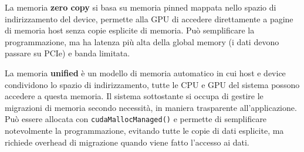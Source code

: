\begin{questions}
\begin{solution}
        La memoria \textbf{zero copy} si basa su memoria pinned mappata nello spazio di indirizzamento del device, permette alla GPU di accedere direttamente a pagine di memoria host senza copie esplicite di memoria. Può semplificare la programmazione, ma ha latenza più alta della global memory (i dati devono passare su PCIe) e banda limitata.
        
        La memoria \textbf{unified} è un modello di memoria automatico in cui host e device condividono lo spazio di indirizzamento, tutte le CPU e GPU del sistema possono accedere a questa memoria. Il sistema sottostante si occupa di gestire le migrazioni di memoria secondo necessità, in maniera trasparente all'applicazione. Può essere allocata con \texttt{cudaMallocManaged()} e permette di semplificare notevolmente la programmazione, evitando tutte le copie di dati esplicite, ma richiede overhead di migrazione quando viene fatto l'accesso ai dati.
    \end{solution}
\end{questions}